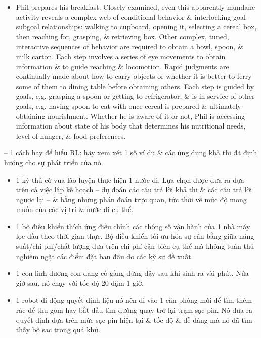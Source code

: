 \documentclass{article}
\begin{document}
\begin{itemize}
\begin{itemize}
\begin{itemize}
            \item Phil prepares his breakfast. Closely examined, even this apparently mundane activity reveals a complex web of conditional behavior \& interlocking goal-subgoal relationships: walking to cupboard, opening it, selecting a cereal box, then reaching for, grasping, \& retrieving box. Other complex, tuned, interactive sequences of behavior are required to obtain a bowl, spoon, \& milk carton. Each step involves a series of eye movements to obtain information \& to guide reaching \& locomotion. Rapid judgments are continually made about how to carry objects or whether it is better to ferry some of them to dining table before obtaining others. Each step is guided by goals, e.g. grasping a spoon or getting to refrigerator, \& is in service of other goals, e.g. having spoon to eat with once cereal is prepared \& ultimately obtaining nourishment. Whether he is aware of it or not, Phil is accessing information about state of his body that determines his nutritional needs, level of hunger, \& food preferences.
        \end{itemize}
        -- 1 cách hay để hiểu RL: hãy xem xét 1 số ví dụ \& các ứng dụng khả thi đã định hướng cho sự phát triển của nó.
        \begin{itemize}
            \item 1 kỳ thủ cờ vua lão luyện thực hiện 1 nước đi. Lựa chọn được đưa ra dựa trên cả việc lập kế hoạch -- dự đoán các câu trả lời khả thi \& các câu trả lời ngược lại -- \& bằng những phán đoán trực quan, tức thời về mức độ mong muốn của các vị trí \& nước đi cụ thể.
            \item 1 bộ điều khiển thích ứng điều chỉnh các thông số vận hành của 1 nhà máy lọc dầu theo thời gian thực. Bộ điều khiển tối ưu hóa sự cân bằng giữa năng suất/chi phí/chất lượng dựa trên chi phí cận biên cụ thể mà không tuân thủ nghiêm ngặt các điểm đặt ban đầu do các kỹ sư đề xuất.
            \item 1 con linh dương con đang cố gắng đứng dậy sau khi sinh ra vài phút. Nửa giờ sau, nó chạy với tốc độ 20 dặm 1 giờ.
            \item 1 robot di động quyết định liệu nó nên đi vào 1 căn phòng mới để tìm thêm rác để thu gom hay bắt đầu tìm đường quay trở lại trạm sạc pin. Nó đưa ra quyết định dựa trên mức sạc pin hiện tại \& tốc độ \& dễ dàng mà nó đã tìm thấy bộ sạc trong quá khứ.

\end{itemize}
\end{itemize}
\end{itemize}
\end{document}
